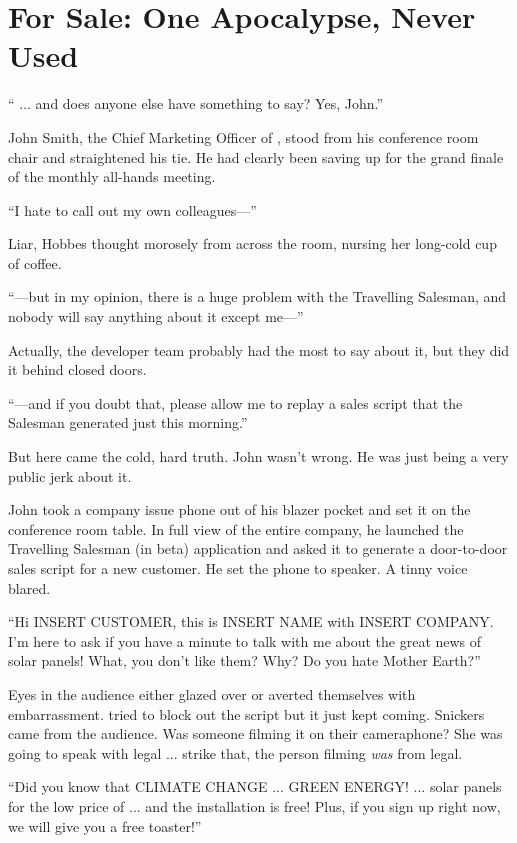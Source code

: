 \chapter{For Sale: One Apocalypse, Never Used}

`` ... and does anyone else have something to say? Yes, John.''

John Smith, the Chief Marketing Officer of \energyCompany{}, stood from his conference room chair and straightened his tie. He had clearly been saving up for the grand finale of the monthly all-hands meeting.

``I hate to call out my own colleagues---''

Liar, {\protag} Hobbes thought morosely from across the room, nursing her long-cold cup of coffee.

``---but in my opinion, there is a huge problem with the Travelling Salesman, and nobody will say anything about it except me---''

Actually, the developer team probably had the most to say about it, but they did it behind closed doors.

``---and if you doubt that, please allow me to replay a sales script that the Salesman generated just this morning.''

But here came the cold, hard truth. John wasn't wrong. He was just being a very public jerk about it.

John took a company issue phone out of his blazer pocket and set it on the conference room table. In full view of the entire company, he launched the Travelling Salesman (in beta) application and asked it to generate a door-to-door sales script for a new customer. He set the phone to speaker. A tinny voice blared.

``Hi INSERT CUSTOMER, this is INSERT NAME with INSERT COMPANY. I'm here to ask if you have a minute to talk with me about the great news of solar panels! What, you don't like them? Why? Do you hate Mother Earth?''

Eyes in the audience either glazed over or averted themselves with embarrassment. {\protag} tried to block out the script but it just kept coming. Snickers came from the audience. Was someone filming it on their cameraphone? She was going to speak with legal ... strike that, the person filming \emph{was} from legal.

``Did you know that CLIMATE CHANGE ... GREEN ENERGY! ... solar panels for the low price of ... and the installation is free! Plus, if you sign up right now, we will give you a free toaster!''

